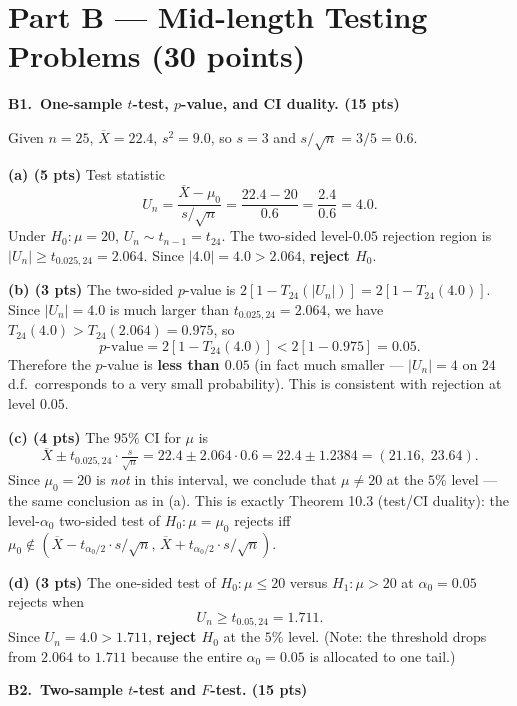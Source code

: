 \documentclass[11pt]{article}
\begin{document}
\bigskip
\section*{Part B --- Mid-length Testing Problems (30 points)}

\textbf{B1.\ One-sample $t$-test, $p$-value, and CI duality. (15 pts)}

Given $n=25$, $\overline{X} = 22.4$, $s^2 = 9.0$, so $s = 3$ and $s/\sqrt{n} = 3/5 = 0.6$.

\textbf{(a) (5 pts)} Test statistic
\[
    U_n = \frac{\overline{X} - \mu_0}{s/\sqrt{n}} = \frac{22.4 - 20}{0.6} = \frac{2.4}{0.6} = 4.0.
\]
Under $H_0\!: \mu = 20$, $U_n \sim t_{n-1} = t_{24}$. The two-sided level-$0.05$ rejection region is $|U_n| \ge t_{0.025, 24} = 2.064$. Since $|4.0| = 4.0 > 2.064$, \textbf{reject $H_0$}.

\textbf{(b) (3 pts)} The two-sided $p$-value is $2[1 - T_{24}(|U_n|)] = 2[1 - T_{24}(4.0)]$. Since $|U_n| = 4.0$ is much larger than $t_{0.025, 24} = 2.064$, we have $T_{24}(4.0) > T_{24}(2.064) = 0.975$, so
\[
    p\text{-value} = 2[1 - T_{24}(4.0)] < 2[1 - 0.975] = 0.05.
\]
Therefore the $p$-value is \textbf{less than $0.05$} (in fact much smaller --- $|U_n| = 4$ on $24$ d.f.\ corresponds to a very small probability). This is consistent with rejection at level $0.05$.

\textbf{(c) (4 pts)} The $95\%$ CI for $\mu$ is
\[
    \overline{X} \pm t_{0.025, 24} \cdot \tfrac{s}{\sqrt{n}}
    = 22.4 \pm 2.064 \cdot 0.6
    = 22.4 \pm 1.2384
    = (21.16,\; 23.64).
\]
Since $\mu_0 = 20$ is \emph{not} in this interval, we conclude that $\mu \neq 20$ at the $5\%$ level --- the same conclusion as in (a). This is exactly Theorem 10.3 (test/CI duality): the level-$\alpha_0$ two-sided test of $H_0\!: \mu = \mu_0$ rejects iff $\mu_0 \notin (\overline{X} - t_{\alpha_0/2}\cdot s/\sqrt{n},\, \overline{X} + t_{\alpha_0/2}\cdot s/\sqrt{n})$.

\textbf{(d) (3 pts)} The one-sided test of $H_0\!: \mu \le 20$ versus $H_1\!: \mu > 20$ at $\alpha_0 = 0.05$ rejects when
\[
    U_n \ge t_{0.05, 24} = 1.711.
\]
Since $U_n = 4.0 > 1.711$, \textbf{reject $H_0$} at the $5\%$ level. (Note: the threshold drops from $2.064$ to $1.711$ because the entire $\alpha_0 = 0.05$ is allocated to one tail.)

\vspace{0.6em}

\textbf{B2.\ Two-sample $t$-test and $F$-test. (15 pts)}
\end{document}
